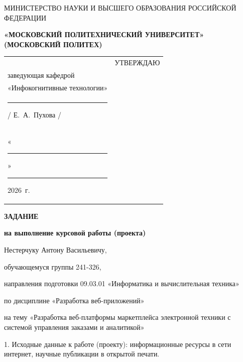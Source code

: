 \documentclass[14pt, a4paper]{extarticle}
\begin{document}
\pagestyle{empty}


\begin{center}
    {\small МИНИСТЕРСТВО НАУКИ И ВЫСШЕГО ОБРАЗОВАНИЯ РОССИЙСКОЙ ФЕДЕРАЦИИ}


    {\small \textbf{«МОСКОВСКИЙ ПОЛИТЕХНИЧЕСКИЙ УНИВЕРСИТЕТ»}} \\
    {\small \textbf{(МОСКОВСКИЙ ПОЛИТЕХ)}}
\end{center}

\begin{tabularx}{\textwidth}{@{} p{} p{} @{}}
     &
    \raggedright
    УТВЕРЖДАЮ                          \\
    заведующая кафедрой                \\
    «Инфокогнитивные технологии»       \\[0.3cm]

    \rule{3cm}{0.4pt} / Е.~А.~Пухова / \\[0.1cm]

    «\rule{0.8cm}{0.4pt}» \rule{3cm}{0.4pt} 2026~г.
\end{tabularx}


\begin{center}

    { \large \textbf{ЗАДАНИЕ}}

    \textbf{на выполнение курсовой работы (проекта)}

    Нестерчуку Антону Васильевичу, %

\end{center}

обучающемуся группы 241-326,

направления подготовки 09.03.01 «Информатика и вычислительная техника»

по дисциплине «Разработка веб-приложений»

на тему «Разработка веб-платформы маркетплейса электронной техники с системой управления заказами и аналитикой»

1. Исходные данные к работе (проекту): информационные ресурсы в сети
интернет, научные публикации в открытой печати.
\end{document}
